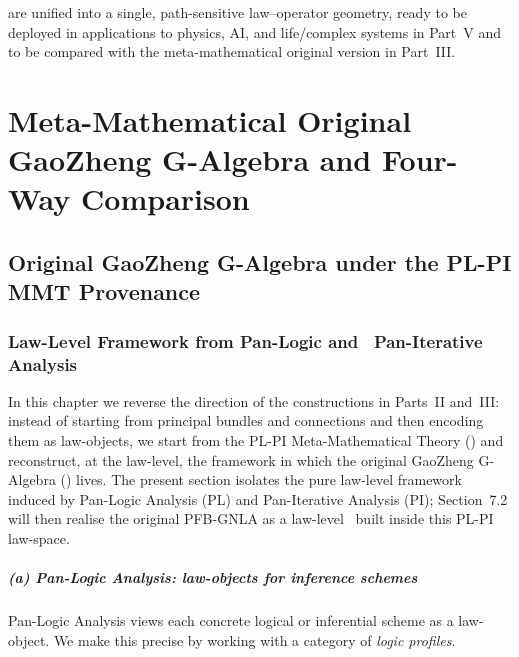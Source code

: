 \documentclass[11pt]{book}
\theoremstyle{plain}
\theoremstyle{definition}
\newcommand{\PLPIMMT}{\text{PL-PI MMT}}
\begin{document}
are unified into a single, path-sensitive law–operator geometry, ready
to be deployed in applications to physics, AI, and life/complex systems in Part~V
and to be compared with the meta-mathematical original version in
Part~III.





\part[Original G-Algebra and Four-Way Comparison]{Meta-Mathematical Original GaoZheng G-Algebra and Four-Way Comparison}


\chapter[Original G-Algebra under PL-PI MMT]{Original GaoZheng G-Algebra under the PL-PI MMT Provenance}


\section{Law-Level Framework from Pan-Logic and \ Pan-Iterative Analysis}


In this chapter we reverse the direction of the constructions in
Parts~II and~III: instead of starting from principal bundles and
connections and then encoding them as law-objects, we start from the
PL-PI Meta-Mathematical Theory (\PLPIMMT) and reconstruct, at the
law-level, the framework in which the original GaoZheng G-Algebra
(\GAlgebra) lives. The present section isolates the pure law-level
framework induced by Pan-Logic Analysis (PL) and Pan-Iterative Analysis
(PI); Section~7.2 will then realise the original PFB-GNLA as a
law-level \GAlgebra\ built inside this PL-PI law-space.



\subsubsection*{(a) Pan-Logic Analysis: law-objects for inference schemes}

Pan-Logic Analysis views each concrete logical or inferential scheme as
a law-object. We make this precise by working with a category of
\emph{logic profiles}.
\end{document}
